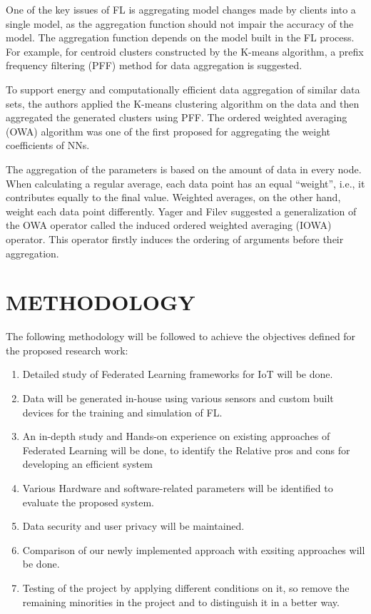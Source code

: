 \documentclass[14pt]{extarticle}
\begin{document}
\par One of the key issues of FL is aggregating model changes made by clients into a single model, as the aggregation function should not impair the accuracy of the model. The aggregation function depends on the model built in the FL process. For example, for centroid clusters constructed by the K-means algorithm, a prefix frequency filtering (PFF) method for data aggregation is suggested. 
\par To support energy and computationally efficient data aggregation of similar data sets, the authors applied the K-means clustering algorithm on the data and then aggregated the generated clusters using PFF. The ordered weighted averaging (OWA) algorithm was one of the first proposed for aggregating the weight coefficients of NNs. 
\par The aggregation of the parameters is based on the amount of data in every node. When calculating a regular average, each data point has an equal “weight”, i.e., it contributes equally to the final value. Weighted averages, on the other hand, weight each data point differently. Yager and Filev suggested a generalization of the OWA operator called the induced ordered weighted averaging (IOWA) operator. This operator firstly induces the ordering of arguments before their aggregation.
\newpage
\section{METHODOLOGY}
The following methodology will be followed to achieve the objectives defined for the proposed research work:
\begin{enumerate}
    \item Detailed study of Federated Learning frameworks for IoT will be done.
    \item Data will be generated in-house using various sensors and custom built devices for the training and simulation of FL.
    \item An in-depth study and Hands-on experience on existing approaches of Federated Learning will be done, to identify the Relative pros and cons for developing an efficient system
    \item Various Hardware and software-related parameters will be identified to evaluate the proposed system. 
    \item Data security and user privacy will be maintained.
    \item Comparison of our newly implemented approach with exsiting approaches will be done.
    \item Testing of the project by applying different conditions on it, so remove the remaining minorities in the project and to distinguish it in a better way. 
\end{enumerate}
\end{document}
